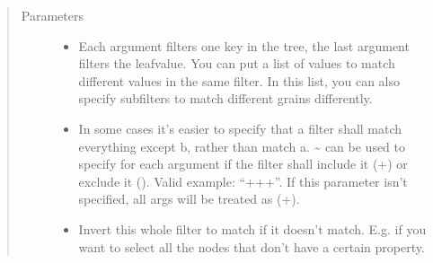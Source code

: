 \documentclass[a4paper,10pt,english]{sphinxmanual}
\begin{document}
\begin{fulllineitems}
\begin{fulllineitems}
\label{\detokenize{fagus.filters:fagus.filters.VFil.__init__}}
\pysigstartsignatures
{}
\pysigstopsignatures\begin{quote}\begin{description}
\item[{Parameters}] \leavevmode\begin{itemize}
\item {}
\sphinxAtStartPar
{} \textendash{} Each argument filters one key in the tree, the last argument filters the leaf\sphinxhyphen{}value. You can
put a list of values to match different values in the same filter. In this list, you can also specify
subfilters to match different grains differently.

\item {}
\sphinxAtStartPar
{} \textendash{} In some cases it’s easier to specify that a filter shall match everything except b, rather than
match a. \textasciitilde{} can be used to specify for each argument if the filter shall include it (+) or exclude it
(\sphinxhyphen{}). Valid example: “++\sphinxhyphen{}+”. If this parameter isn’t specified, all args will be treated as (+).

\item {}
\sphinxAtStartPar
{} \textendash{} Invert this whole filter to match if it doesn’t match. E.g. if you want to select all the nodes
that don’t have a certain property.

\end{itemize}

\end{description}\end{quote}

\end{fulllineitems}



\end{fulllineitems}
\end{document}
